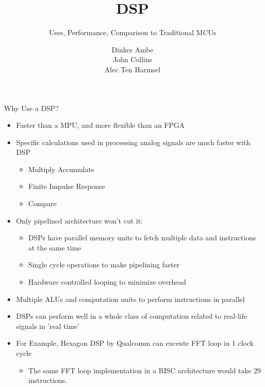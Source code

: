 \documentclass{beamer}
\begin{document}
\beamertemplatenavigationsymbolsempty

\title{DSP}
\subtitle{Uses, Performance, Comparison to Traditional MCUs}
\author{Dinker Ambe\\
John Collins\\
Alec Ten Harmsel}


\frame{\titlepage}

\begin{frame}{Why Use a DSP?}
    \begin{itemize}
        \item Faster than a MPU, and more flexible than an FPGA
        \item Specific calculations used in processing analog signals are much faster with DSP
	\begin{itemize}
                \item Multiply Accumulate 
                \item Finite Impulse Response
                \item Compare
        \end{itemize}
        \item Only pipelined architecture won't cut it:
	\begin{itemize}
                \item DSPs have parallel memory units to fetch multiple data and instructions at the same time
                \item Single cycle operations to make pipelining faster
                \item Hardware controlled looping to minimize overhead
        \end{itemize}
        \item Multiple ALUs and computation units to perform instructions in parallel
        \item DSPs can perform well in a whole class of computation related to real-life signals in 'real time'
        \item For Example, Hexagon DSP by Qualcomm can exceute FFT loop in 1 clock cycle
	\begin{itemize}
                \item The same FFT loop implementation in a RISC architecture would take 29 instructions.
        \end{itemize}
    \end{itemize}
\end{frame}
\end{document}
